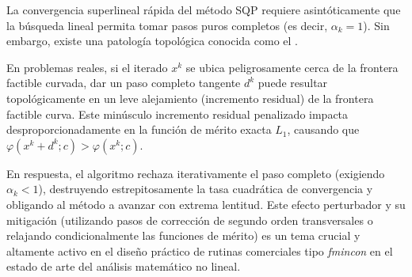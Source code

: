 La convergencia superlineal rápida del método SQP requiere asintóticamente que la búsqueda lineal permita tomar pasos puros completos (es decir, $\alpha_k = 1$). Sin embargo, existe una patología topológica conocida como el .

En problemas reales, si el iterado $x^k$ se ubica peligrosamente cerca de la frontera factible curvada, dar un paso completo tangente $d^k$ puede resultar topológicamente en un leve alejamiento (incremento residual) de la frontera factible curva. Este minúsculo incremento residual penalizado impacta desproporcionadamente en la función de mérito exacta $L_1$, causando que $\varphi(x^k + d^k; c) > \varphi(x^k; c)$.

En respuesta, el algoritmo rechaza iterativamente el paso completo (exigiendo $\alpha_k < 1$), destruyendo estrepitosamente la tasa cuadrática de convergencia y obligando al método a avanzar con extrema lentitud. Este efecto perturbador y su mitigación (utilizando pasos de corrección de segundo orden transversales o relajando condicionalmente las funciones de mérito) es un tema crucial y altamente activo en el diseño práctico de rutinas comerciales tipo \textit{fmincon} en el estado de arte del análisis matemático no lineal.